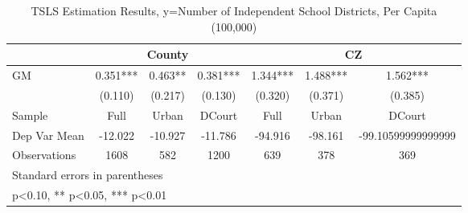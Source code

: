 \begin{table}[htbp]\centering
\def\sym#1{\ifmmode^{#1}\else\(^{#1}\)\fi}
\caption{TSLS Estimation Results, y=Number of Independent School Districts, Per Capita (100,000)}
\begin{tabular}{l*{6}{c}}
\toprule
                &\multicolumn{3}{c}{County}            &\multicolumn{3}{c}{CZ}                \\\cmidrule(lr){2-4}\cmidrule(lr){5-7}
\midrule
GM              &    0.351***&    0.463** &    0.381***&    1.344***&    1.488***&    1.562***\\
                &  (0.110)   &  (0.217)   &  (0.130)   &  (0.320)   &  (0.371)   &  (0.385)   \\
\midrule
Sample          &     Full   &    Urban   &   DCourt   &     Full   &    Urban   &   DCourt   \\
Dep Var Mean    &  -12.022   &  -10.927   &  -11.786   &  -94.916   &  -98.161   &-99.10599999999999   \\
Observations    &     1608   &      582   &     1200   &      639   &      378   &      369   \\
\bottomrule
\multicolumn{7}{l}{\footnotesize Standard errors in parentheses}\\
\multicolumn{7}{l}{\footnotesize * p<0.10, ** p<0.05, *** p<0.01}\\
\end{tabular}
\end{table}
